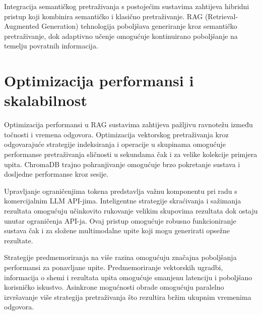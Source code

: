 Integracija semantičkog pretraživanja s postojećim sustavima zahtijeva hibridni pristup koji kombinira semantičko i klasično pretraživanje. RAG (Retrieval-Augmented Generation) tehnologija poboljšava generiranje kroz semantičko pretraživanje, dok adaptivno učenje omogućuje kontinuirano poboljšanje na temelju povratnih informacija.

\section{Optimizacija performansi i skalabilnost}
\label{sec:performance}

Optimizacija performansi u RAG sustavima zahtijeva pažljivu ravnotežu između točnosti i vremena odgovora. Optimizacija vektorskog pretraživanja kroz odgovarajuće strategije indeksiranja i operacije u skupinama omogućuje performanse pretraživanja sličnosti u sekundama čak i za velike kolekcije primjera upita. ChromaDB trajno pohranjivanje omogućuje brzo pokretanje sustava i dosljedne performanse kroz sesije.

Upravljanje ograničenjima tokena predstavlja važnu komponentu pri radu s komercijalnim LLM API-jima. Inteligentne strategije skraćivanja i sažimanja rezultata omogućuju učinkovito rukovanje velikim skupovima rezultata dok ostaju unutar ograničenja API-ja. Ovaj pristup omogućuje robusno funkcioniranje sustava čak i za složene multimodalne upite koji mogu generirati opsežne rezultate.

Strategije predmemoriranja na više razina omogućuju značajna poboljšanja performansi za ponavljane upite. Predmemoriranje vektorskih ugradbi, informacija o shemi i rezultata upita omogućuje smanjenu latenciju i poboljšano korisničko iskustvo. Asinkrone mogućnosti obrade omogućuju paralelno izvršavanje više strategija pretraživanja što rezultira bržim ukupnim vremenima odgovora. 